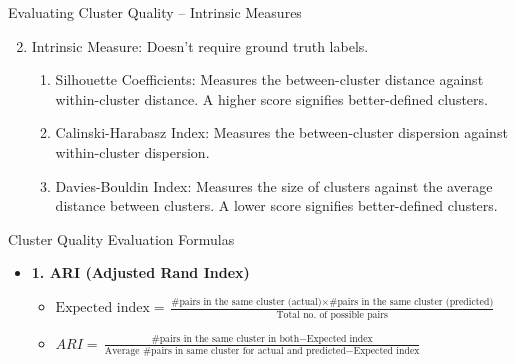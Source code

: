 \documentclass[aspectratio=169,xcolor=dvipsnames,svgnames,x11names,fleqn]{beamer}
\begin{document}
\begin{frame}{Evaluating Cluster Quality -- Intrinsic Measures}
\begin{enumerate}
    \setcounter{enumi}{1}
    \item Intrinsic Measure: Doesn't require ground truth labels.
    \begin{enumerate}
        \item Silhouette Coefficients: Measures the between-cluster distance against within-cluster distance. A higher score signifies better-defined clusters.
        \item Calinski-Harabasz Index: Measures the between-cluster dispersion against within-cluster dispersion.
        \item Davies-Bouldin Index: Measures the size of clusters against the average distance between clusters. A lower score signifies better-defined clusters.
    \end{enumerate}
\end{enumerate}
\end{frame}

\begin{frame}{Cluster Quality Evaluation Formulas}
    \begin{itemize}
    \item \textbf{1. ARI (Adjusted Rand Index)}
    \begin{itemize}
       \item $\text{Expected index} = \frac{\text{\# pairs in the same cluster (actual)} \times \text{\# pairs in the same cluster (predicted)}}{\text{Total no. of possible pairs}}$
\item $ARI = \frac{\text{\# pairs in the same cluster in both} - \text{Expected index}}{\text{Average \# pairs in same cluster for actual and predicted} - \text{Expected index}}$
    \end{itemize}
    
\end{itemize}
\end{frame}
\end{document}
